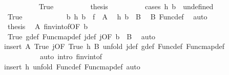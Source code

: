 \begin{isabellebody}
\ \ \ \ \ \ \ \ \isamarkupfalse%
\ True\isanewline
\ \ \ \ \ \ \ \ \isamarkupfalse%
\ {\isacharquery}{\kern0pt}thesis\isanewline
\ \ \ \ \ \ \ \ \isamarkupfalse%
\ {\isacharparenleft}{\kern0pt}cases\ {\isachardoublequoteopen}h\ b{}\ {\isacharequal}{\kern0pt}\ undefined{\isachardoublequoteclose}{\isacharparenright}{\kern0pt}\isanewline
\ \ \ \ \ \ \ \ \ \ \isamarkupfalse%
\ True\isanewline
\ \ \ \ \ \ \ \ \ \ \isamarkupfalse%
\ b{}{\isacharcolon}{\kern0pt}\ {\isachardoublequoteopen}h\ b{}\ {\isasymin}\ f{}\ {\isacharbackquote}{\kern0pt}\ A{}{\isachardoublequoteclose}\ \isamarkupfalse%
\ h\ {\isacartoucheopen}b{}\ {\isasymin}\ B{}{\isacartoucheclose}\ \isamarkupfalse%
\ B{}\ Func{\isacharunderscore}{\kern0pt}def\ \isamarkupfalse%
\ auto\isanewline
\ \ \ \ \ \ \ \ \ \ \isamarkupfalse%
\ {\isacharquery}{\kern0pt}thesis\ \isamarkupfalse%
\ A{}\ f{\isacharunderscore}{\kern0pt}inv{\isacharunderscore}{\kern0pt}into{\isacharunderscore}{\kern0pt}f{\isacharbrackleft}{\kern0pt}OF\ b{}{\isacharbrackright}{\kern0pt}\isanewline
\ \ \ \ \ \ \ \ \ \ \ \ \isamarkupfalse%
\ True\ g{\isacharunderscore}{\kern0pt}def\ Func{\isacharunderscore}{\kern0pt}map{\isacharunderscore}{\kern0pt}def\ j{}{\isacharunderscore}{\kern0pt}def\ j{}{\isacharbrackleft}{\kern0pt}OF\ {\isacartoucheopen}b{}\ {\isasymin}\ B{}{\isacartoucheclose}{\isacharbrackright}{\kern0pt}\ \isamarkupfalse%
\ auto\isanewline
\ \ \ \ \ \ \ \ \isamarkupfalse%
{\isacharparenleft}{\kern0pt}insert\ A{}\ True\ j{}{\isacharbrackleft}{\kern0pt}OF\ True{\isacharbrackright}{\kern0pt}\ h\ B{}{\isacharcomma}{\kern0pt}\ unfold\ j{}{\isacharunderscore}{\kern0pt}def\ g{\isacharunderscore}{\kern0pt}def\ Func{\isacharunderscore}{\kern0pt}def\ Func{\isacharunderscore}{\kern0pt}map{\isacharunderscore}{\kern0pt}def{\isacharcomma}{\kern0pt}\isanewline
\ \ \ \ \ \ \ \ \ \ auto\ intro{\isacharcolon}{\kern0pt}\ f{\isacharunderscore}{\kern0pt}inv{\isacharunderscore}{\kern0pt}into{\isacharunderscore}{\kern0pt}f{\isacharparenright}{\kern0pt}\isanewline
\ \ \ \ \ \ \isamarkupfalse%
{\isacharparenleft}{\kern0pt}insert\ h{\isacharcomma}{\kern0pt}\ unfold\ Func{\isacharunderscore}{\kern0pt}def\ Func{\isacharunderscore}{\kern0pt}map{\isacharunderscore}{\kern0pt}def{\isacharcomma}{\kern0pt}\ auto{\isacharparenright}{\kern0pt}\isanewline

\end{isabellebody}
